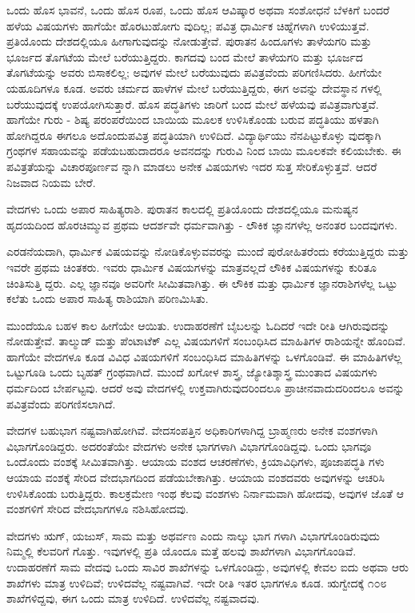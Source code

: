 ಒಂದು ಹೊಸ ಭಾವನೆ, ಒಂದು ಹೊಸ ರೂಪ, ಒಂದು ಹೊಸ ಆವಿಷ್ಕಾರ ಅಥವಾ ಸಂಶೋಧನೆ ಬೆಳಕಿಗೆ ಬಂದರೆ ಹಳೆಯ ವಿಷಯಗಳು ಹಾಗೆಯೇ ಹೊರಟುಹೋಗು ವುದಿಲ್ಲ; ಪವಿತ್ರ ಧಾರ್ಮಿಕ ಚಿಹ್ನೆಗಳಾಗಿ ಉಳಿಯುತ್ತವೆ. ಪ್ರತಿಯೊಂದು ದೇಶದಲ್ಲಿಯೂ ಹೀಗಾಗುವುದನ್ನು ನೋಡುತ್ತೇವೆ. ಪುರಾತನ ಹಿಂದೂಗಳು ತಾಳೆಯಗರಿ ಮತ್ತು ಭೂರ್ಜದ ತೊಗಟೆಯ ಮೇಲೆ ಬರೆಯುತ್ತಿದ್ದರು. ಕಾಗದವು ಬಂದ ಮೇಲೆ ತಾಳೆಯಗರಿ ಮತ್ತು ಭೂರ್ಜದ ತೊಗಟೆಯನ್ನು ಅವರು ಬಿಸಾಕಲಿಲ್ಲ; ಅವುಗಳ ಮೇಲೆ ಬರೆಯುವುದು ಪವಿತ್ರವೆಂದು ಪರಿಗಣಿಸಿದರು. ಹೀಗೆಯೇ ಯಹೂದಿಗಳೂ ಕೂಡ. ಅವರು ಚರ್ಮದ ಹಾಳೆಗಳ ಮೇಲೆ ಬರೆಯುತ್ತಿದ್ದರು, ಈಗ ಅವನ್ನು ದೇವಸ್ಥಾನ ಗಳಲ್ಲಿ ಬರೆಯುವುದಕ್ಕೆ ಉಪಯೋಗಿಸುತ್ತಾರೆ. ಹೊಸ ಪದ್ಧತಿಗಳು ಜಾರಿಗೆ ಬಂದ ಮೇಲೆ ಹಳೆಯವು ಪವಿತ್ರವಾಗುತ್ತವೆ. ಹಾಗೆಯೇ ಗುರು - ಶಿಷ್ಯ ಪರಂಪರೆಯಿಂದ ಬಾಯಿಯ ಮೂಲಕ ಉಳಿಸಿಕೊಂಡು ಬರುವ ಪದ್ಧತಿಯು ಹಳತಾಗಿ ಹೋಗಿದ್ದರೂ ಈಗಲೂ ಅದೊಂದುಪವಿತ್ರ ಪದ್ಧತಿಯಾಗಿ ಉಳಿದಿದೆ. ವಿದ್ಯಾರ್ಥಿಯು ನೆನಪಿಟ್ಟುಕೊಳ್ಳು ವುದಕ್ಕಾಗಿ ಗ್ರಂಥಗಳ ಸಹಾಯವನ್ನು ಪಡೆಯಬಹುದಾದರೂ ಅವನದನ್ನು ಗುರುವಿ ನಿಂದ ಬಾಯಿ ಮೂಲಕವೇ ಕಲಿಯಬೇಕು. ಈ ಪವಿತ್ರತೆಯನ್ನು ವಿಚಾರಪೂರ್ಣವ ನ್ನಾಗಿ ಮಾಡಲು ಅನೇಕ ವಿಷಯಗಳು ಇದರ ಸುತ್ತ ಸೇರಿಕೊಳ್ಳುತ್ತವೆ. ಆದರೆ ನಿಜವಾದ ನಿಯಮ ಬೇರೆ.

ವೇದಗಳು ಒಂದು ಅಪಾರ ಸಾಹಿತ್ಯರಾಶಿ. ಪುರಾತನ ಕಾಲದಲ್ಲಿ ಪ್ರತಿಯೊಂದು ದೇಶದಲ್ಲಿಯೂ ಮನುಷ್ಯನ ಹೃದಯದಿಂದ ಹೊರಚಿಮ್ಮುವ ಪ್ರಥಮ ಆದರ್ಶವೇ ಧರ್ಮವಾಗಿತ್ತು - ಲೌಕಿಕ ಜ್ಞಾನಗಳೆಲ್ಲ ಅನಂತರ ಬಂದವುಗಳು.

ಎರಡನೆಯದಾಗಿ, ಧಾರ್ಮಿಕ ವಿಷಯವನ್ನು ನೋಡಿಕೊಳ್ಳುವವರನ್ನು ಮುಂದೆ ಪುರೋಹಿತರೆಂದು ಕರೆಯುತ್ತಿದ್ದರು ಮತ್ತು ಇವರೇ ಪ್ರಥಮ ಚಿಂತಕರು. ಇವರು ಧಾರ್ಮಿಕ ವಿಷಯಗಳನ್ನು ಮಾತ್ರವಲ್ಲದೆ ಲೌಕಿಕ ವಿಷಯಗಳನ್ನು ಕುರಿತೂ ಚಿಂತಿಸುತ್ತಿ ದ್ದರು. ಎಲ್ಲ ಜ್ಞಾನವೂ ಅವರಿಗೇ ಸೀಮಿತವಾಗಿತ್ತು. ಈ ಲೌಕಿಕ ಮತ್ತು ಧಾರ್ಮಿಕ ಜ್ಞಾನರಾಶಿಗಳೆಲ್ಲ ಒಟ್ಟು ಕಲೆತು ಒಂದು ಅಪಾರ ಸಾಹಿತ್ಯ ರಾಶಿಯಾಗಿ ಪರಿಣಮಿಸಿತು.

ಮುಂದೆಯೂ ಬಹಳ ಕಾಲ ಹೀಗೆಯೇ ಆಯಿತು. ಉದಾಹರಣೆಗೆ ಬೈಬಲನ್ನು ಓದಿದರೆ ಇದೇ ರೀತಿ ಆಗಿರುವುದನ್ನು ನೋಡುತ್ತೇವೆ. ತಾಲ್ಮುಡ್ ಮತ್ತು ಪೆಂಟಾಟೆಕ್ ಎಲ್ಲ ವಿಷಯಗಳಿಗೆ ಸಂಬಂಧಿಸಿದ ಮಾಹಿತಿಗಳ ರಾಶಿಯನ್ನೇ ಹೊಂದಿವೆ. ಹಾಗೆಯೇ ವೇದಗಳೂ ಕೂಡ ವಿವಿಧ ವಿಷಯಗಳಿಗೆ ಸಂಬಂಧಿಸಿದ ಮಾಹಿತಿಗಳನ್ನು ಒಳಗೊಂಡಿವೆ. ಈ ಮಾಹಿತಿಗಳೆಲ್ಲ ಒಟ್ಟುಗೂಡಿ ಒಂದು ಬೃಹತ್ ಗ್ರಂಥವಾಗಿದೆ. ಮುಂದೆ ಖಗೋಳ ಶಾಸ್ತ್ರ, ಜ್ಯೋತಿಶ್ಶಾಸ್ತ್ರ ಮುಂತಾದ ವಿಷಯಗಳು ಧರ್ಮದಿಂದ ಬೇರ್ಪಟ್ಟವು. ಆದರೆ ಅವು ವೇದಗಳಲ್ಲಿ ಉಕ್ತವಾಗಿರುವುದರಿಂದಲೂ ಪ್ರಾಚೀನವಾದುದರಿಂದಲೂ ಅವನ್ನು ಪವಿತ್ರವೆಂದು ಪರಿಗಣಿಸಲಾಗಿದೆ.

ವೇದಗಳ ಬಹುಭಾಗ ನಷ್ಟವಾಗಿಹೋಗಿವೆ. ವೇದಸಂಪತ್ತಿನ ಅಧಿಕಾರಿಗಳಾಗಿದ್ದ ಬ್ರಾಹ್ಮಣರು ಅನೇಕ ವಂಶಗಳಾಗಿ ವಿಭಾಗಗೊಂಡಿದ್ದರು. ಅದರಂತೆಯೇ ವೇದಗಳು ಅನೇಕ ಭಾಗಗಳಾಗಿ ವಿಭಾಗಗೊಂಡಿದ್ದವು. ಒಂದು ಭಾಗವೂ ಒಂದೊಂದು ವಂಶಕ್ಕೆ ಸೀಮಿತವಾಗಿತ್ತು. ಆಯಾಯ ವಂಶದ ಆಚರಣೆಗಳು, ಕ್ರಿಯಾವಿಧಿಗಳು, ಪೂಜಾಪದ್ಧತಿ ಗಳು ಆಯಾಯ ವಂಶಕ್ಕೆ ಸೇರಿದ ವೇದಭಾಗದಿಂದ ಪಡೆಯಬೇಕಾಗಿತ್ತು. ಆಯಾಯ ವಂಶದವರು ಅವುಗಳನ್ನು ಆಚರಿಸಿ ಉಳಿಸಿಕೊಂಡು ಬರುತ್ತಿದ್ದರು. ಕಾಲಕ್ರಮೇಣ ಇಂಥ ಕೆಲವು ವಂಶಗಳು ನಿರ್ನಾಮವಾಗಿ ಹೋದವು, ಅವುಗಳ ಜೊತೆ ಆ ವಂಶಗಳಿಗೆ ಸೇರಿದ ವೇದಭಾಗಗಳೂ ನಶಿಸಿಹೋದವು.

ವೇದಗಳು ಋಗ್, ಯಜುಸ್, ಸಾಮ ಮತ್ತು ಅಥರ್ವಣ ಎಂದು ನಾಲ್ಕು ಭಾಗ ಗಳಾಗಿ ವಿಭಾಗಗೊಂಡಿರುವುದು ನಿಮ್ಮಲ್ಲಿ ಕೆಲವರಿಗೆ ಗೊತ್ತು. ಇವುಗಳಲ್ಲಿ ಪ್ರತಿ ಯೊಂದೂ ಮತ್ತೆ ಹಲವು ಶಾಖೆಗಳಾಗಿ ವಿಭಾಗಗೊಂಡಿವೆ. ಉದಾಹರಣೆಗೆ ಸಾಮ ವೇದವು ಒಂದು ಸಾವಿರ ಶಾಖೆಗಳನ್ನು ಒಳಗೊಂಡಿದ್ದು, ಅವುಗಳಲ್ಲಿ ಕೇವಲ ಐದು ಅಥವಾ ಆರು ಶಾಖೆಗಳು ಮಾತ್ರ ಉಳಿದಿವೆ; ಉಳಿದವೆಲ್ಲ ನಷ್ಟವಾಗಿವೆ. ಇದೇ ರೀತಿ ಇತರ ಭಾಗಗಳೂ ಕೂಡ. ಋಗ್ವೇದಕ್ಕೆ ೧೦೮ ಶಾಖೆಗಳಿದ್ದವು, ಈಗ ಒಂದು ಮಾತ್ರ ಉಳಿದಿದೆ. ಉಳಿದವೆಲ್ಲ ನಷ್ಟವಾದವು.

